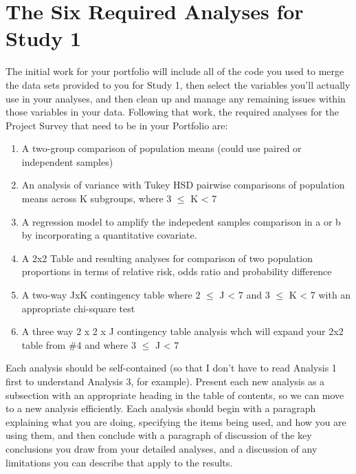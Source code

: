 \documentclass[]{book}
\providecommand{\tightlist}{%
  \setlength{\itemsep}{0pt}\setlength{\parskip}{0pt}}
\theoremstyle{definition}
\theoremstyle{definition}
\theoremstyle{definition}
\theoremstyle{remark}
\begin{document}
\hypertarget{the-six-required-analyses-for-study-1-1}{%
\section{The Six Required Analyses for Study
1}\label{the-six-required-analyses-for-study-1-1}}

The initial work for your portfolio will include all of the code you
used to merge the data sets provided to you for Study 1, then select the
variables you'll actually use in your analyses, and then clean up and
manage any remaining issues within those variables in your data.
Following that work, the required analyses for the Project Survey that
need to be in your Portfolio are:

\begin{enumerate}
\def\labelenumi{\arabic{enumi}.}
\tightlist
\item
  A two-group comparison of population means (could use paired or
  independent samples)
\item
  An analysis of variance with Tukey HSD pairwise comparisons of
  population means across K subgroups, where 3 \(\leq\) K \textless{} 7
\item
  A regression model to amplify the indepedent samples comparison in a
  or b by incorporating a quantitative covariate.
\item
  A 2x2 Table and resulting analyses for comparison of two population
  proportions in terms of relative risk, odds ratio and probability
  difference
\item
  A two-way JxK contingency table where 2 \(\leq\) J \textless{} 7 and 3
  \(\leq\) K \textless{} 7 with an appropriate chi-square test
\item
  A three way 2 x 2 x J contingency table analysis whch will expand your
  2x2 table from \#4 and where 3 \(\leq\) J \textless{} 7
\end{enumerate}

Each analysis should be self-contained (so that I don't have to read
Analysis 1 first to understand Analysis 3, for example). Present each
new analysis as a subsection with an appropriate heading in the table of
contents, so we can move to a new analysis efficiently. Each analysis
should begin with a paragraph explaining what you are doing, specifying
the items being used, and how you are using them, and then conclude with
a paragraph of discussion of the key conclusions you draw from your
detailed analyses, and a discussion of any limitations you can describe
that apply to the results.
\end{document}
